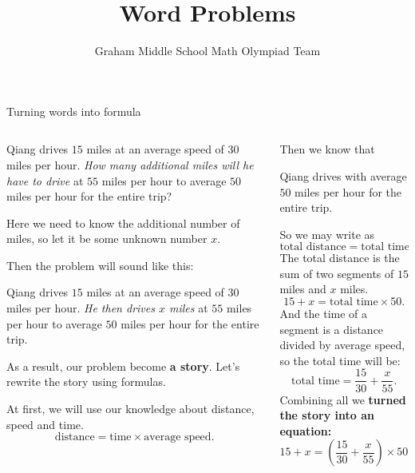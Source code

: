 \documentclass[9pt,aspectratio=169]{beamer}
\title{Word Problems}
\subtitle[Graham Middle School]{Graham Middle School Math Olympiad Team}
\begin{document}
\maketitle

\begin{frame}{Turning words into formula}
  \begin{columns}[T]
    \begin{column}{0.5\textwidth}
      \begin{problem}
        Qiang drives $15$ miles at an average speed of $30$ miles per hour. \emph{How many additional miles will he have to drive} at $55$ miles per hour to average $50$ miles per hour for the entire trip?
      \end{problem}
      Here we need to know the additional number of miles, so let it be some unknown number $x$.

      Then the problem will sound like this:
      \begin{problem}
        Qiang drives $15$ miles at an average speed of $30$ miles per hour. \emph{He then drives $x$ miles} at $55$ miles per hour to average $50$ miles per hour for the entire trip.
      \end{problem}
      As a result, our problem become \textbf{a story}. Let's rewrite the story using formulas.
      
      At first, we will use our knowledge about distance, speed and time.
      \[ \text{distance} = \text{time} \times \text{average speed}. \]
    \end{column}
    \begin{column}{0.5\textwidth}

      Then we know that 
      \begin{problem}
        Qiang drives with average $50$ miles per hour for the entire trip.
      \end{problem}
      So we may write as
      \[ \text{total distance} = \text{total time} \times 50. \]
      The total distance is the sum of two segments of $15$ miles and $x$ miles.
      \[ 15 + x = \text{total time} \times 50. \]
      And the time of a segment is a distance divided by average speed, so the total time will be:
      \[ \text{total time} = \frac{15}{30} + \frac{x}{55}. \]
      Combining all we \textbf{turned the story into an equation:}
      \[ 15 + x = \left(\frac{15}{30} + \frac{x}{55}\right) \times 50. \]
    \end{column}
  \end{columns}
\end{frame}
\end{document}
